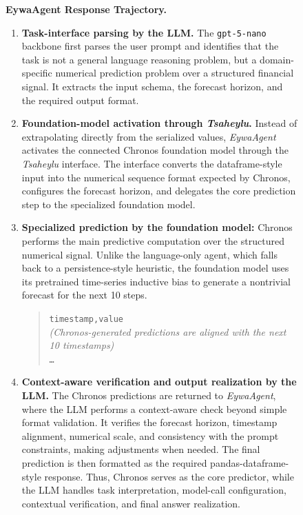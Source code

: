 \begin{figure}[h]
{\begin{tcolorbox}
\textbf{EywaAgent Response Trajectory.}
\begin{enumerate}
    \item \textbf{Task-interface parsing by the LLM.} 
    The \texttt{gpt-5-nano} backbone first parses the user prompt and identifies that the task is not a general language reasoning problem, but a domain-specific numerical prediction problem over a structured financial signal. It extracts the input schema, the forecast horizon, and the required output format.

    \item \textbf{Foundation-model activation through \textit{Tsaheylu}.}
    Instead of extrapolating directly from the serialized values, \textit{EywaAgent} activates the connected Chronos foundation model through the \textit{Tsaheylu} interface. The interface converts the dataframe-style input into the numerical sequence format expected by Chronos, configures the forecast horizon, and delegates the core prediction step to the specialized foundation model.

    \item \textbf{Specialized prediction by the foundation model:}
    Chronos performs the main predictive computation over the structured numerical signal. Unlike the language-only agent, which falls back to a persistence-style heuristic, the foundation model uses its pretrained time-series inductive bias to generate a nontrivial forecast for the next 10 steps.

    \begin{quote}
    \small
    \texttt{timestamp,value}\\
    \textit{(Chronos-generated predictions are aligned with the next 10 timestamps)}\\
    \texttt{\ldots}
    \end{quote}

    \item \textbf{Context-aware verification and output realization by the LLM.}
    The Chronos predictions are returned to \textit{EywaAgent}, where the LLM performs a context-aware check beyond simple format validation. It verifies the forecast horizon, timestamp alignment, numerical scale, and consistency with the prompt constraints, making adjustments when needed. The final prediction is then formatted as the required pandas-dataframe-style response. Thus, Chronos serves as the core predictor, while the LLM handles task interpretation, model-call configuration, contextual verification, and final answer realization.
\end{enumerate}



\end{tcolorbox}}
\end{figure}

